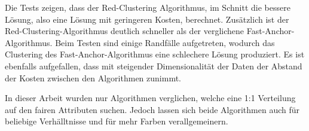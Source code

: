Die Tests zeigen, dass der Red-Clustering Algorithmus, im Schnitt die bessere Lösung, also eine Lösung mit geringeren Kosten, berechnet. Zusätzlich ist der Red-Clustering-Algorithmus deutlich schneller als der verglichene Fast-Anchor-Algorithmus. Beim Testen sind einige Randfälle aufgetreten, wodurch das Clustering des Fast-Anchor-Algorithmus eine schlechere Lösung produziert.
Es ist ebenfalls aufgefallen, dass mit steigender Dimensionalität der Daten der Abstand der Kosten zwischen den Algorithmen zunimmt.

In dieser Arbeit wurden nur Algorithmen verglichen, welche eine 1:1 Verteilung auf den fairen Attributen suchen. Jedoch lassen sich beide Algorithmen auch für beliebige Verhälltnisse und für mehr Farben verallgemeinern.